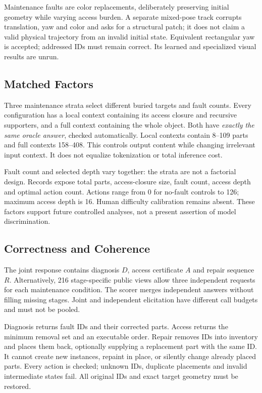 Maintenance faults are color replacements, deliberately preserving
initial geometry while varying access burden. A separate mixed-pose
track corrupts translation, yaw and color and asks for a structural
patch; it does not claim a valid physical trajectory from an invalid
initial state. Equivalent rectangular yaw is accepted; addressed IDs
must remain correct. Its learned and specialized visual results are unrun.

\subsection{Matched Factors}
Three maintenance strata select different buried targets and fault
counts. Every configuration has a local context containing its access
closure and recursive supporters, and a full context containing the
whole object. Both have \emph{exactly the same oracle answer}, checked
automatically. Local contexts contain 8--109 parts and full contexts
158--408. This controls output content while changing irrelevant input
context. It does not equalize tokenization or total inference cost.

Fault count and selected depth vary together: the strata are not a
factorial design. Records expose total parts, access-closure size,
fault count, access depth and optimal action count. Actions range from
0 for no-fault controls to 126; maximum access depth is 16. Human
difficulty calibration remains absent. These factors support future
controlled analyses, not a present assertion of model discrimination.

\subsection{Correctness and Coherence}
The joint response contains diagnosis $D$, access certificate $A$ and
repair sequence $R$. Alternatively, 216 stage-specific public views
allow three independent requests for each maintenance condition.
The scorer merges independent answers without filling missing stages.
Joint and independent elicitation have different call budgets and
must not be pooled.

Diagnosis returns fault IDs and their corrected parts. Access returns
the minimum removal set and an executable order. Repair removes IDs
into inventory and places them back, optionally supplying a replacement
part with the same ID. It cannot create new instances, repaint in place,
or silently change already placed parts. Every action is checked;
unknown IDs, duplicate placements and invalid intermediate states fail.
All original IDs and exact target geometry must be restored.

